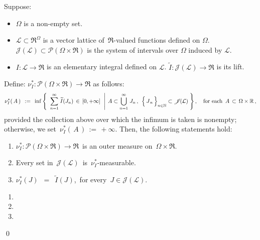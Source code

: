 
\begin{lemma}
\mbox{}\vskip 0.1cm
\noindent
Suppose:
\begin{itemize}
\item
	$\Omega$ is a non-empty set.
\item
	$\mathcal{L} \subset \Re^{\Omega}$ is a vector lattice of \,$\Re$-valued functions defined on $\Omega$.
	\vskip 0.05cm
	$\mathscr{J}\!(\mathcal{L}) \subset \mathcal{P}\!\left(\Omega\times\Re\right)$ is the system of intervals
	over $\Omega$ induced by $\mathcal{L}$.
\item
	$I : \mathcal{L} \longrightarrow \Re$ is an elementary integral defined on $\mathcal{L}$.
	\vskip 0.05cm
	$\widetilde{I} : \mathscr{J}\!(\mathcal{L}) \longrightarrow \Re$ is its lift.
\end{itemize}
Define:\;
$\nu^{*}_{I} : \mathcal{P}(\Omega\times\Re) \longrightarrow \Re$ as follows:
\begin{equation*}
\nu^{*}_{I}\!\left(\,A\,\right) 
\;\, := \;\,
	\inf\left\{\;\,
	\left.
		\overset{\infty}{\underset{n=1}{\sum}}\; \widetilde{I}(J_{n}) \,\in\, [0,+\infty]
	\;\;\right\vert\;
		A \subset \overset{\infty}{\underset{n=1}{\bigcup}}\;J_{n}\,,\;\,
		\left\{\,\overset{{\color{white}.}}{J}_{n}\,\right\}_{n\in\N} \subset \mathscr{J}\!(\mathcal{L})
	\;\right\},
\quad
\textnormal{for each \,$A \,\subset\, \Omega \times \Re$}\,,
\end{equation*}
provided the collection above over which the infimum is taken is nonempty;
otherwise, we set \,$\nu^{*}_{I}\!\left(\,A\,\right) \,:=\, +\infty$.
\vskip 0.1cm
\noindent
Then, the following statements hold:
\begin{enumerate}
\item
	$\nu^{*}_{I} : \mathcal{P}(\Omega\times\Re) \longrightarrow \Re$\,
	is an outer measure on \,$\Omega \times \Re$.
\item
	Every set in \,$\mathscr{J}\!(\mathcal{L})$\, is \,$\nu^{*}_{I}$-measurable.
\item
	$\nu^{*}_{I}(J)$ \,$=$\, $\widetilde{I}(J)$,\, for every \,$J \in \mathscr{J}\!(\mathcal{L})$.
\end{enumerate}
\end{lemma}
\proof
\begin{enumerate}
\item
\item
\item
\end{enumerate}
\qed


\renewcommand{\theenumi}{\roman{enumi}}
\renewcommand{\labelenumi}{\textnormal{(\theenumi)}$\;\;$}

